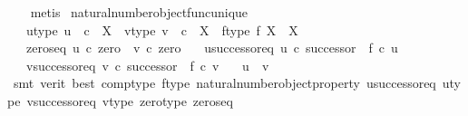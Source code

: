 \begin{isabellebody}
\ \ \isamarkupfalse%
\ metis%
\endisatagproof
{\isafoldproof}%
%
\isadelimproof
\isanewline
%
\endisadelimproof
\isanewline
{}\isamarkupfalse%
\ natural{\isacharunderscore}{\kern0pt}number{\isacharunderscore}{\kern0pt}object{\isacharunderscore}{\kern0pt}func{\isacharunderscore}{\kern0pt}unique{\isacharcolon}{\kern0pt}\isanewline
\ \ \ u{\isacharunderscore}{\kern0pt}type{\isacharcolon}{\kern0pt}\ {\isachardoublequoteopen}u\ {\isacharcolon}{\kern0pt}\ {\isasymnat}\isactrlsub c\ {\isasymrightarrow}\ X{\isachardoublequoteclose}\ \ v{\isacharunderscore}{\kern0pt}type{\isacharcolon}{\kern0pt}\ {\isachardoublequoteopen}v\ {\isacharcolon}{\kern0pt}\ {\isasymnat}\isactrlsub c\ {\isasymrightarrow}\ X{\isachardoublequoteclose}\ \ f{\isacharunderscore}{\kern0pt}type{\isacharcolon}{\kern0pt}\ {\isachardoublequoteopen}f{\isacharcolon}{\kern0pt}\ X\ {\isasymrightarrow}\ X{\isachardoublequoteclose}\isanewline
\ \ \ zeros{\isacharunderscore}{\kern0pt}eq{\isacharcolon}{\kern0pt}\ {\isachardoublequoteopen}u\ {\isasymcirc}\isactrlsub c\ zero\ {\isacharequal}{\kern0pt}\ v\ {\isasymcirc}\isactrlsub c\ zero{\isachardoublequoteclose}\isanewline
\ \ \ u{\isacharunderscore}{\kern0pt}successor{\isacharunderscore}{\kern0pt}eq{\isacharcolon}{\kern0pt}\ {\isachardoublequoteopen}u\ {\isasymcirc}\isactrlsub c\ successor\ {\isacharequal}{\kern0pt}\ f\ {\isasymcirc}\isactrlsub c\ u{\isachardoublequoteclose}\isanewline
\ \ \ v{\isacharunderscore}{\kern0pt}successor{\isacharunderscore}{\kern0pt}eq{\isacharcolon}{\kern0pt}\ {\isachardoublequoteopen}v\ {\isasymcirc}\isactrlsub c\ successor\ {\isacharequal}{\kern0pt}\ f\ {\isasymcirc}\isactrlsub c\ v{\isachardoublequoteclose}\isanewline
\ \ \ {\isachardoublequoteopen}u\ {\isacharequal}{\kern0pt}\ v{\isachardoublequoteclose}\isanewline
%
\isadelimproof
\ \ %
\endisadelimproof
%
\isatagproof
{}\isamarkupfalse%
\ {\isacharparenleft}{\kern0pt}smt\ {\isacharparenleft}{\kern0pt}verit{\isacharcomma}{\kern0pt}\ best{\isacharparenright}{\kern0pt}\ comp{\isacharunderscore}{\kern0pt}type\ f{\isacharunderscore}{\kern0pt}type\ natural{\isacharunderscore}{\kern0pt}number{\isacharunderscore}{\kern0pt}object{\isacharunderscore}{\kern0pt}property{}\ u{\isacharunderscore}{\kern0pt}successor{\isacharunderscore}{\kern0pt}eq\ u{\isacharunderscore}{\kern0pt}type\ v{\isacharunderscore}{\kern0pt}successor{\isacharunderscore}{\kern0pt}eq\ v{\isacharunderscore}{\kern0pt}type\ zero{\isacharunderscore}{\kern0pt}type\ zeros{\isacharunderscore}{\kern0pt}eq{\isacharparenright}{\kern0pt}%

\end{isabellebody}
